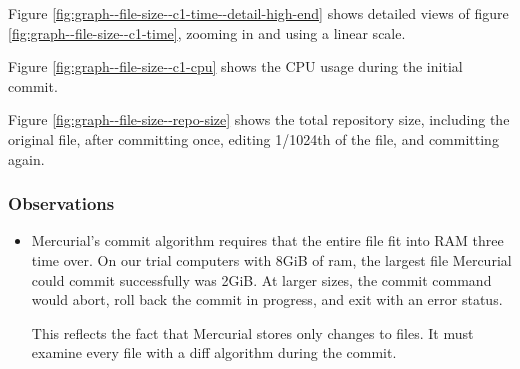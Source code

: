 \documentclass[a4paper]{article}
\begin{document}
Figure \ref{fig:graph--file-size--c1-time--detail-high-end} shows
detailed views of figure \ref{fig:graph--file-size--c1-time}, zooming
in and using a linear scale.

Figure \ref{fig:graph--file-size--c1-cpu} shows the
CPU usage during the initial commit.

Figure \ref{fig:graph--file-size--repo-size} shows the total
repository size, including the original file, after committing once, editing
1/1024th of the file, and committing again.

\iffalse

\subsubsection{Observations}

\begin{itemize}

  \item Mercurial's commit algorithm requires that the entire file fit into RAM
    three time over. On our trial computers with 8GiB of ram, the largest file
    Mercurial could commit successfully was 2GiB. At larger sizes, the commit
    command would abort, roll back the commit in progress, and exit with an
    error status.

    This reflects the fact that Mercurial stores only changes to files. It must
    examine every file with a diff algorithm during the commit.

\end{itemize}

\end{document}
